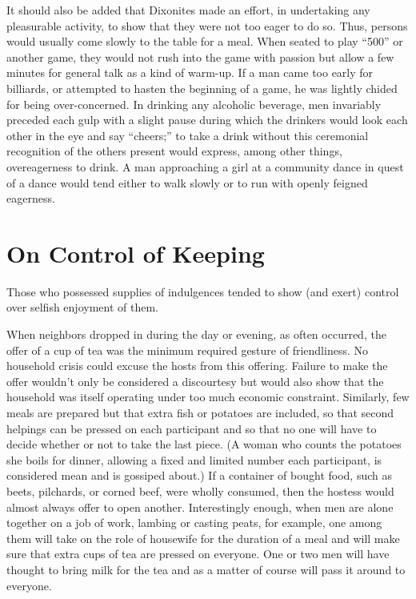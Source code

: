 \documentclass[twoside,symmetric,nobib,justified]{tufte-book}
\begin{document}
It should also be added that Dixonites made an effort, in undertaking
any pleasurable activity, to show that they were not too eager to do so.
Thus, persons would usually come slowly to the table for a meal. When
seated to play ``500'' or another game, they would not rush into the
game with passion but allow a few minutes for general talk as a kind of
warm-up. If a man came too early for billiards, or attempted to hasten
the beginning of a game, he was lightly chided for being over-concerned.
In drinking any alcoholic beverage, men invariably preceded each gulp
with a slight pause during which the drinkers would look each other in
the eye and say ``cheers;'' to take a drink without this ceremonial
recognition of the others present would express, among other things,
overeagerness to drink. A man approaching a girl at a community dance in
quest of a dance would tend either to walk slowly or to run with openly
feigned eagerness.

\hypertarget{on-control-of-keeping}{%
\section{On Control of Keeping}\label{on-control-of-keeping}}

Those who possessed supplies of indulgences tended to show (and exert)
control over selfish enjoyment of them.

When neighbors dropped in during the day or evening, as often occurred,
the offer of a cup of tea was the minimum required gesture of
friendliness. No household crisis could excuse the hosts from this
offering. Failure to make the offer wouldn't only be considered a
discourtesy but would also show that the household was itself operating
under too much economic constraint. Similarly, few meals are prepared
but that extra fish or potatoes are included, so that second helpings
can be pressed on each participant and so that no one will have to
decide whether or not to take the last piece. (A woman who counts the
potatoes she boils for dinner, allowing a fixed and limited number each
participant, is considered mean and is gossiped about.) If a container
of bought food, such as beets, pilchards, or corned beef, were wholly
consumed, then the hostess would almost always offer to open another.
Interestingly enough, when men are alone together on a job of work,
lambing or casting peats, for example, one among them will take on the
role of housewife for the duration of a meal and will make sure that
extra cups of tea are pressed on everyone. One or two men will have
thought to bring milk for the tea and as a matter of course will pass it
around to everyone.
\end{document}
